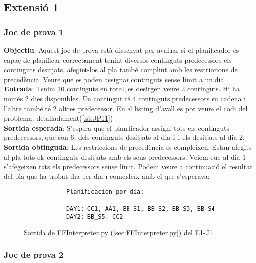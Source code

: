 \documentclass[a4paper]{article}
\begin{document}
	
	\subsection{Extensió 1}
	
	
	\subsubsection*{Joc de prova 1}
	
	\noindent \textbf{Objectiu}: Aquest joc de prova està dissenyat per avaluar si el planificador és capaç de planificar correctament tenint diversos continguts predecessors els continguts desitjats, afegint-los al pla també complint amb les restriccions de precedència. Veure que es poden assignar continguts sense límit a un dia. \\
	
	\noindent \textbf{Entrada}: Tenim 10 continguts en total, es desitgen veure 2 continguts. Hi ha només 2 dies disponibles. Un contingut té 4 continguts predecessors en cadena i l'altre també té 2 altres predecessor. En el listing d'avall es pot veure el codi del problema.  detalladament(\ref{lst:JP11}) \\
	
	\noindent \textbf{Sortida esperada}: S'espera que el planificador assigni tots els continguts predecessors, que son 6, dels continguts desitjats al dia 1 i els desitjats al dia 2. \\
	
	\noindent \textbf{Sortida obtinguda}: Les restriccions de precedència es compleixen. Estan afegits al pla tots els continguts desitjats amb els seus predecessors. Veiem que al dia 1 s'afegeixen tots els predecessors sense límit. Podem veure a continuació el resultat del pla que ha trobat dia per dia i coincideix amb el que s'esperava:
	
	\begin{figure}[H]
		\centering
		\begin{verbatim}
			Planificación por día:
			
			DAY1: CC1, AA1, BB_S1, BB_S2, BB_S3, BB_S4
			DAY2: BB_S5, CC2	
		\end{verbatim}
		\caption{Sortida de FFInterpreter.py (\ref{sec:FFInterpreter.py}) del E1-J1.}
	\end{figure}	
	
	\subsubsection*{Joc de prova 2}
	
\end{document}
